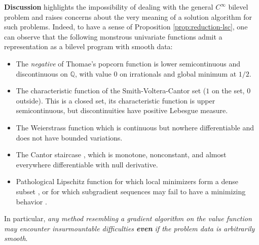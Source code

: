 \documentclass{article}
\newcommand*{\cP}{\mathcal{P}}
\newcommand{\SA}{\mathcal{SA}}
\newcommand{\unbounded}{\text{unbound}}
\newcommand{\optim}{\text{optim}}
\newcommand{\pessim}{\text{pessim}}
\theoremstyle{plain}
\newtheorem{theorem}{Theorem}[section]
\theoremstyle{definition}
\begin{document}
\begin{appendices}
\noindent \textbf{Discussion}  highlights the impossibility of dealing with the general $ C^\infty$ bilevel problem and raises concerns about the very meaning of a solution algorithm for such problems. Indeed, to have a sense of Proposition \ref{prop:reduction-lsc}, one can observe that the following monstrous univariate functions admit a representation as a bilevel program with smooth data: 
\begin{itemize}
    \item The \emph{negative} of Thomae's popcorn function \cite[Example 5.1.6h)]{bartle2011realanalysis} is lower semicontinuous and discontinuous on $\mathbb{Q}$, with value $0$ on irrationals and global minimum at $1/2$.
    \item The characteristic function of the Smith-Voltera-Cantor set \cite[Definition 11.1.10]{bartle2011realanalysis} ($1$ on the set, $0$ outside). This is a closed set, its characteristic function is upper semicontinuous, but discontinuities have positive Lebesgue measure.
    \item The Weierstrass function \cite[Remark of Theorem 6.1.2]{bartle2011realanalysis} which is continuous but nowhere differentiable and does not have bounded variations.
    \item The Cantor staircase \cite[Section 6.5.3]{thomson2008elementary}, which is monotone, nonconstant, and almost everywhere differentiable with null derivative.
    \item Pathological Lipschitz function for which local minimizers form a dense subset \cite{loewen2000typical}, or for which subgradient sequences may fail to have a minimizing behavior \cite{daniilidis2020pathological,rios2022examples}.
\end{itemize}  
In particular, \emph{any method resembling a gradient algorithm on the value function may encounter insurmountable difficulties \textbf{even} if the problem data is arbitrarily smooth}.


\end{appendices}
\end{document}
